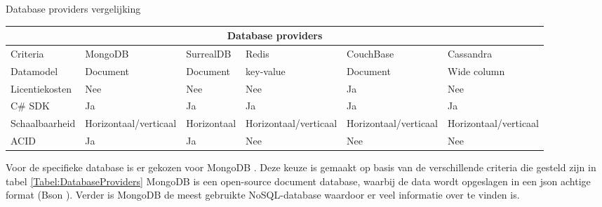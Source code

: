 \whitespace[2]
\begin{graphic}
	\captionsetup{type=table}
	\caption{Database providers vergelijking}
	\begin{tabular}{ |p{6.2em}||p{2.2cm}|p{2.2cm}|p{2.2cm}|p{2.2cm}|p{2.4cm}| }
		\hline
		\multicolumn{6}{|c|}{Database providers}                                                                                                             \\
		\hline
		Criteria       & MongoDB                     & SurrealDB   & Redis                       & CouchBase                   & Cassandra                   \\
		\hline
		Datamodel      & Document                    & Document    & key-value                   & Document                    & Wide column                 \\
		\hline
		Licentiekosten & Nee                         & Nee         & Nee                         & Ja                          & Nee                         \\
		\hline
		C\# \gls{SDK}  & Ja                          & Ja          & Ja                          & Ja                          & Ja                          \\
		\hline
		Schaalbaarheid & Horizontaal\slash verticaal & Horizontaal & Horizontaal\slash verticaal & Horizontaal\slash verticaal & Horizontaal\slash verticaal \\
		\hline
		ACID           & Ja                          & Ja          & Nee                         & Nee                         & Nee                         \\
		\hline
	\end{tabular}
	\label{Tabel:DatabaseProviders}
\end{graphic}

\whitespace
Voor de specifieke database is er gekozen voor MongoDB \parencite{MongoDB}.
Deze keuze is gemaakt op basis van de verschillende criteria die gesteld zijn in tabel \ref{Tabel:DatabaseProviders}
MongoDB is een open-source document database, waarbij de data wordt opgeslagen in een json achtige format (Bson \parencite{Bson}).
Verder is MongoDB de meest gebruikte NoSQL-database waardoor er veel informatie over te vinden is.
